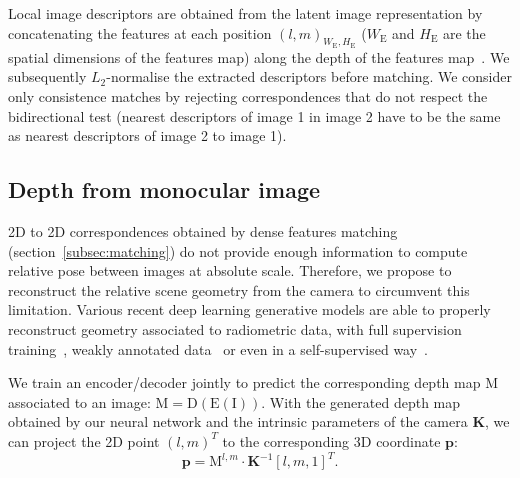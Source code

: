 Local image descriptors are obtained from the latent image representation by concatenating the features at each position $\left( l, m \right)_{W_\mathrm{E},H_\mathrm{E}}$ ($W_\mathrm{E}$ and $H_\mathrm{E}$ are the spatial dimensions of the features map) along the depth of the features map~\citep{Taira2018, Widya2018}. We subsequently $L_2$-normalise the extracted descriptors before matching. We consider only consistence matches by rejecting correspondences that do not respect the bidirectional test (nearest descriptors of image 1 in image 2 have to be the same as nearest descriptors of image 2 to image 1).

\subsection{Depth from monocular image}
\label{subsec:depth_map}
2D to 2D correspondences obtained by dense features matching (section~\ref{subsec:matching}) do not provide enough information to compute relative pose between images at absolute scale. Therefore, we propose to reconstruct the relative scene geometry from the camera to circumvent this limitation. Various recent deep learning generative models are able to properly reconstruct geometry associated to radiometric data, with full supervision training~\cite{Eigen2014}, weakly annotated data~\cite{Godard2017} or even in a self-supervised way~\cite{Mahjourian2018}. 

We train an encoder/decoder jointly to predict the corresponding depth map $\mathrm{M}$ associated to an image: $\mathrm{M = D(E(I))}$. With the generated depth map obtained by our neural network and the intrinsic parameters of the camera $\mathbf{K}$, we can project the 2D point $\left( l, m \right)^T$ to the corresponding 3D coordinate $\mathbf{p}$:
\begin{equation}
	\label{eq:3d_proj}
	\mathbf{p} = \mathrm{M}^{l, m} \cdot \mathbf{K}^{-1}[l, m, 1]^T.
\end{equation}